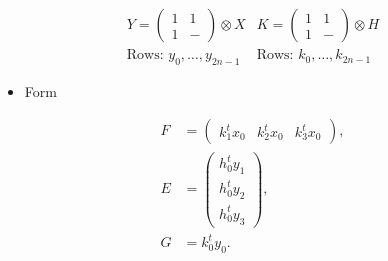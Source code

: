 \documentclass{beamer}
\begin{document}
\begin{frame}

  \[
    \begin{array}{cc}
      Y = \left( \begin{smallmatrix} 1&1\\1&- \end{smallmatrix} \right) \otimes X
                                           &
      K = \left( \begin{smallmatrix} 1&1\\1&- \end{smallmatrix} \right) \otimes H
      \\
      \text{Rows: } y_0, \dots, y_{2n-1}
                                      &
      \text{Rows: } k_0, \dots, k_{2n-1}
    \end{array}
  \]

  \begin{itemize}
    \item Form
  \end{itemize}

  \begin{align*}
    F &= \begin{pmatrix} k_1^tx_0 & k_2^tx_0 & k_3^tx_0 \end{pmatrix}, \\
    E &= \begin{pmatrix} h_0^ty_1 \\ h_0^ty_2 \\ h_0^ty_3 \end{pmatrix}, \\
    G &= k_0^ty_0.
  \end{align*}
  
\end{frame}
\end{document}
